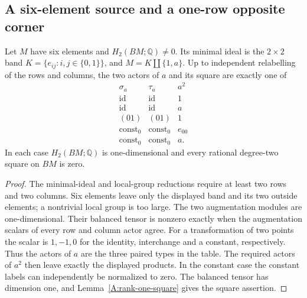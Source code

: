 \subsection{A six-element source and a one-row opposite corner}

\begin{lemma}
\label{CP2:A-six-positive-shapes}
Let $M$ have six elements and $H_2(BM;\mathbb Q)\ne0$.
Its minimal ideal is the $2\times2$ band
$K=\{e_{ij}:i,j\in\{0,1\}\}$, and
$M=K\amalg\{1,a\}$. Up to independent relabelling of the
rows and columns, the two actors of $a$ and its square are
exactly one of
\[
\begin{array}{c|c|c}
\sigma_a&\tau_a&a^2\\\hline
\mathrm{id}&\mathrm{id}&1\\
\mathrm{id}&\mathrm{id}&a\\
(01)&(01)&1\\
\mathrm{const}_0&\mathrm{const}_0&e_{00}\\
\mathrm{const}_0&\mathrm{const}_0&a.
\end{array}
\]
In each case $H_2(BM;\mathbb Q)$ is one-dimensional and
every rational degree-two square on $BM$ is zero.
\end{lemma}
\begin{proof}
The minimal-ideal and local-group reductions require at
least two rows and two columns. Six elements leave only
the displayed band and its two outside elements; a
nontrivial local group is too large. The two augmentation
modules are one-dimensional. Their balanced tensor is
nonzero exactly when the augmentation scalars of every
row and column actor agree. For a transformation of two
points the scalar is $1,-1,0$ for the identity, interchange
and a constant, respectively. Thus the actors of $a$ are
the three paired types in the table. The required actors
of $a^2$ then leave exactly the displayed products.
In the constant case the constant labels can independently
be normalized to zero. The balanced tensor has dimension
one, and Lemma~\ref{A:rank-one-square} gives the square
assertion.
\end{proof}


